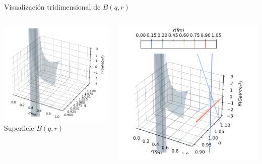 \documentclass{beamer}
\begin{document}
\begin{frame}{Visualización tridimensional de \( B(q, r) \)}
  \begin{columns}
    \includegraphics[width=\linewidth]{figures/B(q,r).png}
    \vspace{0.1cm}
    \centering \color{black} \scriptsize{Superficie \( B(q, r) \)}

    \includegraphics[width=\linewidth]{figures/B(q)-different-r.png}


\end{columns}
\end{frame}
\end{document}
